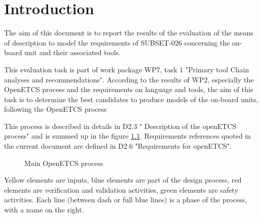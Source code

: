 

\chapter{Introduction}
\label{sec:intro}


The aim of this document is to report the results of the evaluation of the means of description to model the requirements of SUBSET-026 concerning the on-board unit and their associated tools.

This evaluation task is part of work package WP7, task 1  "Primary tool Chain analyses and recommendations". According to the results of WP2, especially the OpenETCS process and the requirements on language and tools, the aim of this task is to determine the best candidates to  produce models of the on-board units, following the OpenETCS process

This process is described in details in D2.3 " Description of the openETCS process" and is summed up in the figure \ref{fig:main_process}. Requirements references quoted in the current document are defined in D2.6 "Requirements for openETCS".
 

 \begin{figure}
  \centering
  \caption{Main OpenETCS process}
  \label{fig:main_process}
\end{figure}

Yellow elements are inputs, blue elements are part of the design process, red elements are verification and validation activities, green elements are safety activities. Each line (between dash or full blue lines) is a phase of the process, with a name on the right. 

